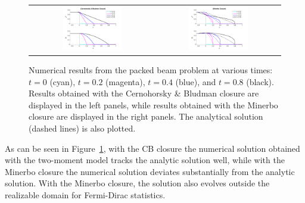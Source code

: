 \begin{figure}[H]
  \centering
  \begin{tabular}{cc}
    \includegraphics[width=0.5\textwidth]{figures/PackedBeam_ME_CB} &
    \includegraphics[width=0.5\textwidth]{figures/PackedBeam_ME_MI}
  \end{tabular}
   \caption{Numerical results from the packed beam problem at various times: $t=0$ (cyan), $t=0.2$ (magenta), $t=0.4$ (blue), and $t=0.8$ (black).  Results obtained with the Cernohorsky \& Bludman closure are displayed in the left panels, while results obtained with the Minerbo closure are displayed in the right panels.  The analytical solution (dashed lines) is also plotted.}
  \label{fig:PackedBeam}
\end{figure}

As can be seen in Figure~\ref{fig:PackedBeam}, with the CB closure the numerical solution obtained with the two-moment model tracks the analytic solution well, while with the Minerbo closure the numerical solution deviates substantially from the analytic solution.  
With the Minerbo closure, the solution also evolves outside the realizable domain for Fermi-Dirac statistics.  

